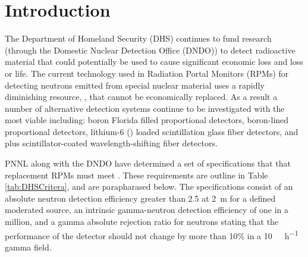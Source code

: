 \documentclass[draftcls,onecolumn]{IEEEtran}
\begin{document}
\section{Introduction}
\label{sec:Intro}
The Department of Homeland Security (DHS) continues to fund research (through the Domestic Nuclear Detection Office (DNDO)) to detect radioactive material that could potentially be used to cause significant economic loss and loss or life.  
The current technology used in Radiation Portal Monitors (RPMs) for detecting neutrons emitted from special nuclear material uses a rapidly diminishing resource, , that cannot be economically replaced. 
As a result a number of alternative detection systems continue to be investigated with the most viable including: boron Florida  filled proportional detectors, boron-lined proportional detectors, lithium-6 () loaded scintillation glass fiber detectors, and  plus scintillator-coated wavelength-shifting fiber detectors\cite{pnnl_18471,kouzes_neutron_2010}.  

PNNL along with the DNDO have determined a set of specifications that that replacement RPMs must meet \cite{kouzes_neutron_2010, kouzes_neutron_1999}. 
These requirements are outline in Table \ref{tab:DHSCritera}, and are parapharased below.
The specifications consist of an absolute neutron detection efficiency greater than \SI{2.5}{\cps} at \SI{2}{\meter} for a defined moderated source, an intrinsic gamma-neutron detection efficiency of one in a million, and a gamma absolute rejection ratio for neutrons stating that the performance of the detector should not change by more than 10\% in a \SI{10}{\milli\roetgen\per\hour} gamma field.
\end{document}
